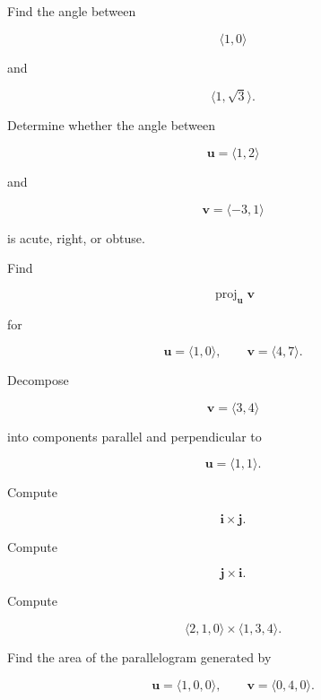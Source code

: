 \begin{exercise}[2]
Find the angle between

\[ \langle1,0\rangle \]

and

\[ \langle1,\sqrt3\rangle. \]
\end{exercise}

\begin{exercise}[2]
Determine whether the angle between

\[ \mathbf{u}=\langle1,2\rangle \]

and

\[ \mathbf{v}=\langle-3,1\rangle \]

is acute, right, or obtuse.
\end{exercise}

\begin{exercise}[2]
Find

\[ \operatorname{proj}_{\mathbf{u}}\mathbf{v} \]

for

\[ \mathbf{u}=\langle1,0\rangle,\qquad
\mathbf{v}=\langle4,7\rangle. \]
\end{exercise}

\begin{exercise}[2]
Decompose

\[ \mathbf{v}=\langle3,4\rangle \]

into components parallel and perpendicular to

\[ \mathbf{u}=\langle1,1\rangle. \]
\end{exercise}

\begin{exercise}[1]
Compute

\[ \mathbf{i}\times\mathbf{j}. \]
\end{exercise}

\begin{exercise}[1]
Compute

\[ \mathbf{j}\times\mathbf{i}. \]
\end{exercise}

\begin{exercise}[2]
Compute

\[ \langle2,1,0\rangle\times\langle1,3,4\rangle. \]
\end{exercise}

\begin{exercise}[2]
Find the area of the parallelogram generated by

\[ \mathbf{u}=\langle1,0,0\rangle,\qquad
\mathbf{v}=\langle0,4,0\rangle. \]
\end{exercise}


